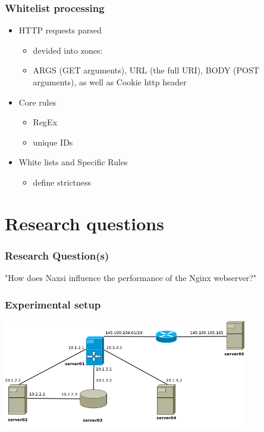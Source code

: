 \begin{frame}
  \frametitle{Whitelist processing}
    \begin{itemize}
     \item HTTP requests parsed
      \begin{itemize}
        \item devided into zones:
	\item ARGS (GET arguments), URL (the full URI), BODY (POST arguments), as well as Cookie http header
      \end{itemize}
      \item Core rules
      \begin{itemize}
        \item RegEx
	\item unique IDs
      \end{itemize}
     \item White lists and Specific Rules
       \begin{itemize}
        \item define strictness
      \end{itemize}
  \end{itemize}
\end{frame}

\section{Research questions}

\begin{frame}
  \frametitle{Research Question(s)}
   \begin{center}
   \LARGE{"How does Naxsi influence the performance of the Nginx webserver?"}
  \end{center}
\end{frame}


\begin{frame}
  \frametitle{Experimental setup}
    \begin{center} 
      \includegraphics[width=0.80\textwidth]{../paper/images/infrastructure.png}
    \end{center}
\end{frame}
